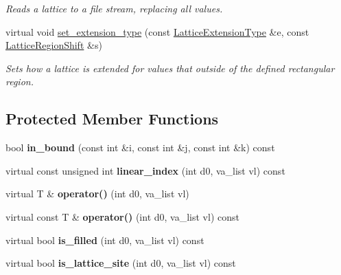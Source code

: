 \begin{DoxyCompactItemize}
\begin{DoxyCompactList}\small\item\em Reads a lattice to a file stream, replacing all values. \end{DoxyCompactList}\item 
\mbox{\label{classsisl_1_1body__centered__cubic_a705c45755b3b186e904a637aabc7026b}} 
virtual void \hyperlink{classsisl_1_1body__centered__cubic_a705c45755b3b186e904a637aabc7026b}{set\+\_\+extension\+\_\+type} (const \hyperlink{namespacesisl_aaf1f41d23ed37dacaa4c9f1bb6d3324f}{Lattice\+Extension\+Type} \&e, const \hyperlink{namespacesisl_af139f6f74488292ae48c0d71eaa5d4f1}{Lattice\+Region\+Shift} \&s)
\begin{DoxyCompactList}\small\item\em Sets how a lattice is extended for values that outside of the defined rectangular region. \end{DoxyCompactList}\end{DoxyCompactItemize}
\subsection*{Protected Member Functions}
\begin{DoxyCompactItemize}
\item 
\mbox{\label{classsisl_1_1body__centered__cubic_a47fdb8d33daa6f699aad7ec63387fd93}} 
bool {\bfseries in\+\_\+bound} (const int \&i, const int \&j, const int \&k) const
\item 
\mbox{\label{classsisl_1_1body__centered__cubic_a2b3b01a3855ca9509d6ff64518b2b5a0}} 
virtual const unsigned int {\bfseries linear\+\_\+index} (int d0, va\+\_\+list vl) const
\item 
\mbox{\label{classsisl_1_1body__centered__cubic_a279eb7ccc6eeea3a16f960ffd2176b3c}} 
virtual T \& {\bfseries operator()} (int d0, va\+\_\+list vl)
\item 
\mbox{\label{classsisl_1_1body__centered__cubic_ae3c39465ea275d0958d626fa4c044ede}} 
virtual const T \& {\bfseries operator()} (int d0, va\+\_\+list vl) const
\item 
\mbox{\label{classsisl_1_1body__centered__cubic_ad4f59dcda9bc1e62272a9d2f01a1d164}} 
virtual bool {\bfseries is\+\_\+filled} (int d0, va\+\_\+list vl) const
\item 
\mbox{\label{classsisl_1_1body__centered__cubic_ad370f360adfb1cfcf3d84387be565e29}} 
virtual bool {\bfseries is\+\_\+lattice\+\_\+site} (int d0, va\+\_\+list vl) const
\end{DoxyCompactItemize}


